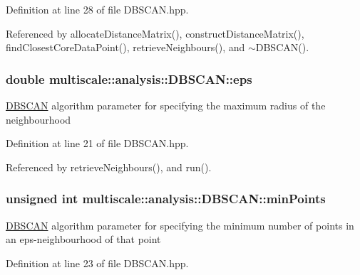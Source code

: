 \-Definition at line 28 of file \-D\-B\-S\-C\-A\-N.\-hpp.



\-Referenced by allocate\-Distance\-Matrix(), construct\-Distance\-Matrix(), find\-Closest\-Core\-Data\-Point(), retrieve\-Neighbours(), and $\sim$\-D\-B\-S\-C\-A\-N().

\hypertarget{classmultiscale_1_1analysis_1_1DBSCAN_a8d68cd84561cbb06bd138f8edf340b9f}{
\subsubsection[{eps}]{\setlength{\rightskip}{0pt plus 5cm}double {\bf multiscale\-::analysis\-::\-D\-B\-S\-C\-A\-N\-::eps}}}\label{classmultiscale_1_1analysis_1_1DBSCAN_a8d68cd84561cbb06bd138f8edf340b9f}
\hyperlink{classmultiscale_1_1analysis_1_1DBSCAN}{\-D\-B\-S\-C\-A\-N} algorithm parameter for specifying the maximum radius of the neighbourhood 

\-Definition at line 21 of file \-D\-B\-S\-C\-A\-N.\-hpp.



\-Referenced by retrieve\-Neighbours(), and run().

\hypertarget{classmultiscale_1_1analysis_1_1DBSCAN_a7bafd4070ac44e236fcc7f06d92b6572}{
\subsubsection[{min\-Points}]{\setlength{\rightskip}{0pt plus 5cm}unsigned int {\bf multiscale\-::analysis\-::\-D\-B\-S\-C\-A\-N\-::min\-Points}}}\label{classmultiscale_1_1analysis_1_1DBSCAN_a7bafd4070ac44e236fcc7f06d92b6572}
\hyperlink{classmultiscale_1_1analysis_1_1DBSCAN}{\-D\-B\-S\-C\-A\-N} algorithm parameter for specifying the minimum number of points in an eps-\/neighbourhood of that point 

\-Definition at line 23 of file \-D\-B\-S\-C\-A\-N.\-hpp.



